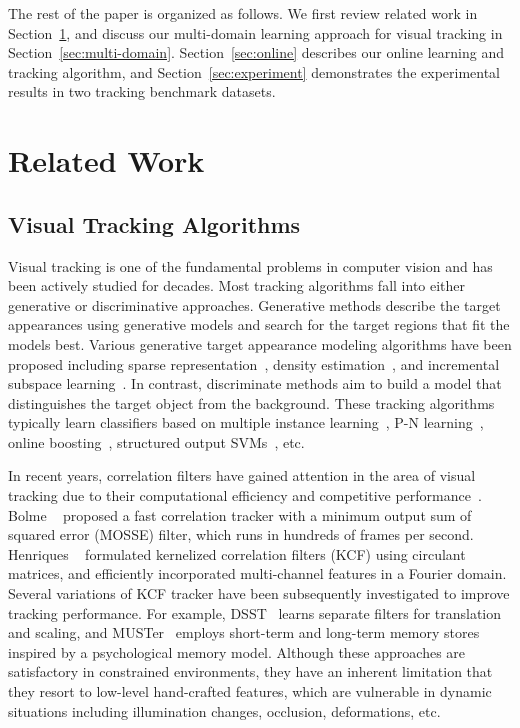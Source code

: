 \documentclass[10pt,twocolumn,letterpaper]{article}
\begin{document}
The rest of the paper is organized as follows.
We first review related work in Section~\ref{sec:related}, and discuss our multi-domain learning approach for visual tracking in Section~\ref{sec:multi-domain}.
Section~\ref{sec:online} describes our online learning and tracking algorithm, and Section~\ref{sec:experiment} demonstrates the experimental results in two tracking benchmark datasets.


\section{Related Work}
\label{sec:related}

\subsection{Visual Tracking Algorithms}
Visual tracking is one of the fundamental problems in computer vision and has been actively studied for decades. 
Most tracking algorithms fall into either generative or discriminative approaches. 
Generative methods describe the target appearances using generative models and search for the target regions that fit the models best. 
Various generative target appearance modeling algorithms have been proposed including sparse representation~\cite{mei2009robust,zhang2012robust}, density estimation~\cite{HanTPAMI08,JepsonTPAMI03}, and incremental subspace learning~\cite{ross2008incremental}. 
In contrast, discriminate methods aim to build a model that distinguishes the target object from the background.  
These tracking algorithms typically learn classifiers based on multiple instance learning~\cite{BabenkoTPAMI11}, P-N learning~\cite{kalal2012tracking}, online boosting~\cite{GrabnerBMVC06,GrabnerECCV08}, structured output SVMs~\cite{hare2011struck}, etc.

In recent years, correlation filters have gained attention in the area of visual tracking due to their computational efficiency and competitive performance~\cite{BolmeCVPR10,henriques2015high,danelljan2014accurate,hong2015multi}. 
Bolme \etal~\cite{BolmeCVPR10} proposed a fast correlation tracker with a minimum output sum of squared error (MOSSE) filter, which runs in hundreds of frames per second. 
Henriques \etal~\cite{henriques2015high} formulated  kernelized correlation filters (KCF) using circulant matrices, and efficiently incorporated multi-channel features in a Fourier domain. 
Several variations of KCF tracker have been subsequently investigated to improve tracking performance.
For example, DSST~\cite{danelljan2014accurate} learns separate filters for translation and scaling, and MUSTer~\cite{hong2015multi} employs short-term and long-term memory stores inspired by a psychological memory model. 
Although these approaches are satisfactory in constrained environments, they have an inherent limitation that they resort to low-level hand-crafted features, which are vulnerable in dynamic situations including illumination changes, occlusion, deformations, etc.  
\end{document}
